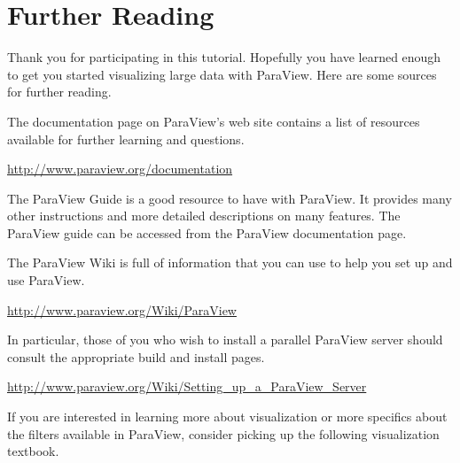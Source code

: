 \chapter{Further Reading}
\label{chap:FurtherReading}

Thank you for participating in this tutorial.  Hopefully you have learned
enough to get you started visualizing large data with ParaView.  Here are
some sources for further reading.

The documentation page on ParaView's web site contains a list of resources
available for further learning and questions.

\begin{reflist}
\item \href{http://www.paraview.org/documentation}{http://www.paraview.org/documentation}
\end{reflist}

The ParaView Guide is a good resource to have with ParaView.  It provides
many other instructions and more detailed descriptions on many features.
The ParaView guide can be accessed from the ParaView documentation page.


The ParaView Wiki is full of information that you can use to help you set
up and use ParaView.
\begin{reflist}
\item \href{http://www.paraview.org/Wiki/ParaView}{http://www.paraview.org/Wiki/ParaView}
\end{reflist}
In particular, those of you who wish to install a parallel ParaView server
should consult the appropriate build and install pages.
\begin{reflist}
\item \href{http://www.paraview.org/Wiki/Setting_up_a_ParaView_Server}{http://www.paraview.org/Wiki/Setting\_up\_a\_ParaView\_Server}
\end{reflist}

If you are interested in learning more about visualization or more
specifics about the filters available in ParaView, consider picking up the
following visualization textbook.

